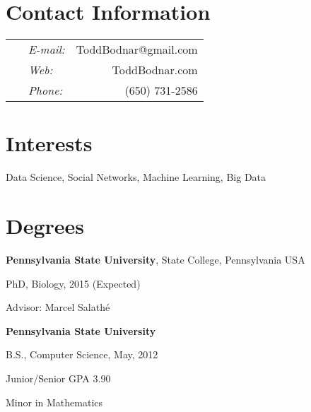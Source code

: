 \documentclass[margin,line]{res}
\newenvironment{list1}{
  \begin{list}{\ding{113}}{%
      \setlength{\itemsep}{0in}
      \setlength{\parsep}{0in} \setlength{\parskip}{0in}
      \setlength{\topsep}{0in} \setlength{\partopsep}{0in} 
      \setlength{\leftmargin}{0.17in}}}{\end{list}}
\begin{document}

\begin{resume}
\section{\sc Contact Information}
\vspace{.05in}
\begin{tabular}{@{}p{3.7in}p{.5in} r }
\   &  {\it E-mail:}  & ToddBodnar@gmail.com \\         
\   &  {\it Web:}  & ToddBodnar.com \\
\  & {\it Phone:} & (650) 731-2586 \\
\end{tabular}


\section{\sc Interests}
Data Science, Social Networks, Machine Learning, Big Data


\section{\sc Degrees}
{\bf Pennsylvania State University}, State College, Pennsylvania USA\\
\vspace*{-.1in}
\begin{list1}
\item[] PhD, Biology, 2015 (Expected)
\item[] Advisor: Marcel Salath\'e
\end{list1}



{\bf Pennsylvania State University} \\
\vspace*{-.1in}
\begin{list1}
\item[] B.S., Computer Science,  May, 2012 
\item[] Junior/Senior GPA 3.90
\item[] Minor in Mathematics
\end{list1}


\end{resume}
\end{document}
